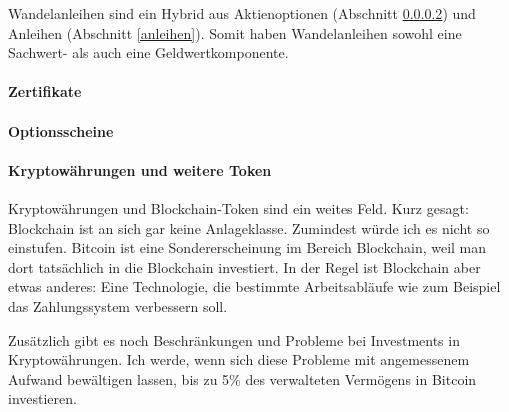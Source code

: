 \documentclass{article}
\begin{document}
Wandelanleihen sind ein Hybrid aus Aktienoptionen (Abschnitt \ref{optionsscheine}) und Anleihen (Abschnitt \ref{anleihen}). Somit haben Wandelanleihen sowohl eine Sachwert- als auch eine Geldwertkomponente.

\paragraph{Zertifikate}

\paragraph{Optionsscheine} \label{optionsscheine}

\paragraph{Kryptowährungen und weitere Token}

Kryptowährungen und Blockchain-Token sind ein weites Feld. Kurz gesagt: Blockchain ist an sich gar keine Anlageklasse. Zumindest würde ich es nicht so einstufen. Bitcoin ist eine Sondererscheinung im Bereich Blockchain, weil man dort tatsächlich in die Blockchain investiert. In der Regel ist Blockchain aber etwas anderes: Eine Technologie, die bestimmte Arbeitsabläufe wie zum Beispiel das Zahlungssystem verbessern soll.

Zusätzlich gibt es noch Beschränkungen und Probleme bei Investments in Kryptowährungen. Ich werde, wenn sich diese Probleme mit angemessenem Aufwand bewältigen lassen, bis zu 5\% des verwalteten Vermögens in Bitcoin investieren.
\end{document}
